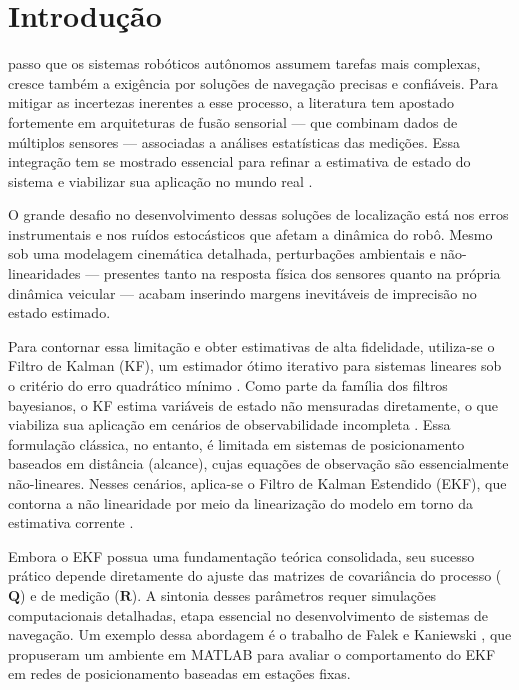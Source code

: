 
\section{Introdução}
\label{sec:introduction}

 passo que os sistemas robóticos autônomos assumem tarefas mais complexas, cresce também a exigência por soluções de navegação precisas e confiáveis. Para mitigar as incertezas inerentes a esse processo, a literatura tem apostado fortemente em arquiteturas de fusão sensorial — que combinam dados de múltiplos sensores — associadas a análises estatísticas das medições. Essa integração tem se mostrado essencial para refinar a estimativa de estado do sistema e viabilizar sua aplicação no mundo real \cite{odry2018kalman, reina2007adaptive}.

O grande desafio no desenvolvimento dessas soluções de localização está nos erros instrumentais e nos ruídos estocásticos que afetam a dinâmica do robô. Mesmo sob uma modelagem cinemática detalhada, perturbações ambientais e não-linearidades — presentes tanto na resposta física dos sensores quanto na própria dinâmica veicular — acabam inserindo margens inevitáveis de imprecisão no estado estimado.

Para contornar essa limitação e obter estimativas de alta fidelidade, utiliza-se o Filtro de Kalman (KF), um estimador ótimo iterativo para sistemas lineares sob o critério do erro quadrático mínimo \cite{kalman1960new}. Como parte da família dos filtros bayesianos, o KF estima variáveis de estado não mensuradas diretamente, o que viabiliza sua aplicação em cenários de observabilidade incompleta \cite{thrun2005probabilistic}. Essa formulação clássica, no entanto, é limitada em sistemas de posicionamento baseados em distância (alcance), cujas equações de observação são essencialmente não-lineares. Nesses cenários, aplica-se o Filtro de Kalman Estendido (EKF), que contorna a não linearidade por meio da linearização do modelo em torno da estimativa corrente \cite{thrun2005probabilistic, chen2012kalman}.

Embora o EKF possua uma fundamentação teórica consolidada, seu sucesso prático depende diretamente do ajuste das matrizes de covariância do processo ($\mathbf{Q}$) e de medição ($\mathbf{R}$). A sintonia desses parâmetros requer simulações computacionais detalhadas, etapa essencial no desenvolvimento de sistemas de navegação. Um exemplo dessa abordagem é o trabalho de Falek e Kaniewski \cite{falek2020computer}, que propuseram um ambiente em MATLAB para avaliar o comportamento do EKF em redes de posicionamento baseadas em estações fixas.

